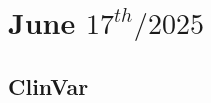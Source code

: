 \documentclass[../main.tex]{subfiles}
\begin{document}
\chapter{June $17^{th} / 2025$}
\label{ch:tufte-design}

\section{ClinVar} \cite{Landrum2016} \cite{Landrum2018}
\end{document}
